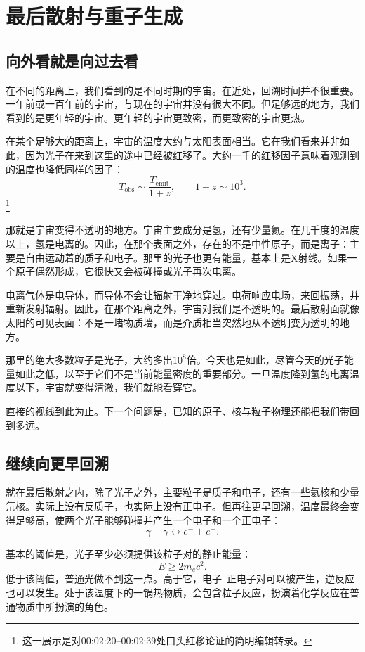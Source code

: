 \chapter{最后散射与重子生成}

\section{向外看就是向过去看}

在不同的距离上，我们看到的是不同时期的宇宙。在近处，回溯时间并不很重要。一年前或一百年前的宇宙，与现在的宇宙并没有很大不同。但足够远的地方，我们看到的是更年轻的宇宙。更年轻的宇宙更致密，而更致密的宇宙更热。

在某个足够大的距离上，宇宙的温度大约与太阳表面相当。它在我们看来并非如此，因为光子在来到这里的途中已经被红移了。大约一千的红移因子意味着观测到的温度也降低同样的因子：
\[
T_{\mathrm{obs}} \sim \frac{T_{\mathrm{emit}}}{1+z},
\qquad
1+z \sim 10^3.
\]\footnote{这一展示是对00:02:20--00:02:39处口头红移论证的简明编辑转录。}

那就是宇宙变得不透明的地方。宇宙主要成分是氢，还有少量氦。在几千度的温度以上，氢是电离的。因此，在那个表面之外，存在的不是中性原子，而是离子：主要是自由运动着的质子和电子。那里的光子也更有能量，基本上是X射线。如果一个原子偶然形成，它很快又会被碰撞或光子再次电离。

电离气体是电导体，而导体不会让辐射干净地穿过。电荷响应电场，来回振荡，并重新发射辐射。因此，在那个距离之外，宇宙对我们是不透明的。最后散射面就像太阳的可见表面：不是一堵物质墙，而是介质相当突然地从不透明变为透明的地方。

那里的绝大多数粒子是光子，大约多出\(10^8\)倍。今天也是如此，尽管今天的光子能量如此之低，以至于它们不是当前能量密度的重要部分。一旦温度降到氢的电离温度以下，宇宙就变得清澈，我们就能看穿它。

直接的视线到此为止。下一个问题是，已知的原子、核与粒子物理还能把我们带回到多远。

\section{继续向更早回溯}

就在最后散射之内，除了光子之外，主要粒子是质子和电子，还有一些氦核和少量氘核。实际上没有反质子，也实际上没有正电子。但再往更早回溯，温度最终会变得足够高，使两个光子能够碰撞并产生一个电子和一个正电子：
\[
\gamma + \gamma \leftrightarrow e^- + e^+.
\]

基本的阈值是，光子至少必须提供该粒子对的静止能量：
\[
E \ge 2m_e c^2.
\]
低于该阈值，普通光做不到这一点。高于它，电子--正电子对可以被产生，逆反应也可以发生。处于该温度下的一锅热物质，会包含粒子反应，扮演着化学反应在普通物质中所扮演的角色。

